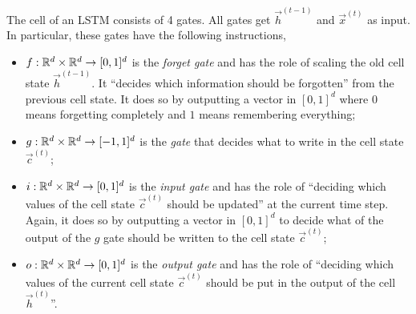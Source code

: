 The cell of an LSTM consists of 4 gates. All gates get $\vec{h}^{(t-1)}$ and $\vec{x}^{(t)}$ as
input. In particular, these gates have the following instructions,
\begin{itemize}
    \item $f: \mathbb{R}^d \times \mathbb{R}^d \to [0,1]^d$ is the \textit{forget gate} and has the role of scaling
          the old cell state $\vec{h}^{(t-1)}$. It ``decides which information should be forgotten''
          from the previous cell state. It does so by outputting a vector in $[0,1]^d$ where $0$ means
          forgetting completely and $1$ means remembering everything;

    \item $g: \mathbb{R}^d \times \mathbb{R}^d \to [-1, 1]^d$ is the \textit{gate} that decides what to write in the
          cell state $\vec{c}^{(t)}$;

    \item $i: \mathbb{R}^d \times \mathbb{R}^d \to [0,1]^d$ is the \textit{input gate} and has the role of ``deciding
          which values of the cell state $\vec{c}^{(t)}$ should be updated'' at the current time step.
          Again, it does so by outputting a vector in $[0,1]^d$ to decide what of the output of the $g$
          gate should be written to the cell state $\vec{c}^{(t)}$;

    \item $o: \mathbb{R}^d \times \mathbb{R}^d \to [0,1]^d$ is the \textit{output gate} and has the role of
          ``deciding which values of the current cell state $\vec{c}^{(t)}$ should be put in the output
          of the cell $\vec{h}^{(t)}$''.
\end{itemize}

